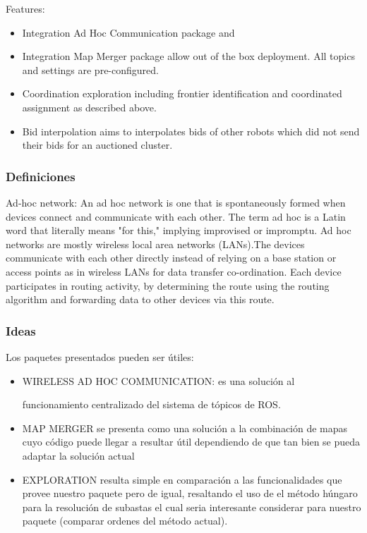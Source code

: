 Features:
\begin{itemize}
\item Integration Ad Hoc Communication package and
\item Integration Map Merger package allow out of the box deployment. All topics and settings are pre-configured.
\item Coordination exploration including frontier identification and coordinated assignment as described above.
\item Bid interpolation aims to interpolates bids of other robots which did not send their bids for an auctioned cluster.
\end{itemize}

\subsubsection{Definiciones}
Ad-hoc network: An ad hoc network is one that is spontaneously formed when devices connect and communicate with each other. The term ad hoc is a Latin word that literally means "for this," implying improvised or impromptu. Ad hoc networks are mostly wireless local area networks (LANs).The devices communicate with each other directly instead of relying on a base station or access points as in wireless LANs for data transfer co-ordination. Each device participates in routing activity, by determining the route using the routing algorithm and forwarding data to other devices via this route. 


\subsubsection{Ideas}
Los paquetes presentados pueden ser útiles:
\begin{itemize}
\item WIRELESS AD HOC COMMUNICATION: es una solución al 
  
  funcionamiento centralizado del sistema de tópicos de ROS.
\item MAP MERGER se presenta como una solución a la combinación de mapas cuyo código puede llegar a resultar útil dependiendo de que tan bien se pueda adaptar la solución actual
\item EXPLORATION resulta simple en comparación a las funcionalidades que provee nuestro paquete pero de igual, resaltando el uso de el método húngaro para la resolución de subastas el cual seria interesante considerar para nuestro paquete (comparar ordenes del método actual).
\end{itemize}

